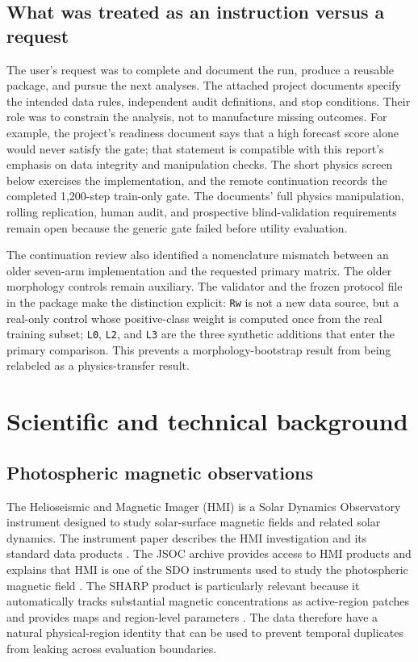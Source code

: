 \documentclass[11pt,oneside]{report}
\begin{document}
\section{What was treated as an instruction versus a request}

The user’s request was to complete and document the run, produce a reusable package, and pursue the next analyses. The attached project documents specify the intended data rules, independent audit definitions, and stop conditions. Their role was to constrain the analysis, not to manufacture missing outcomes. For example, the project’s readiness document says that a high forecast score alone would never satisfy the gate; that statement is compatible with this report’s emphasis on data integrity and manipulation checks. The short physics screen below exercises the implementation, and the remote continuation records the completed 1,200-step train-only gate. The documents’ full physics manipulation, rolling replication, human audit, and prospective blind-validation requirements remain open because the generic gate failed before utility evaluation.

The continuation review also identified a nomenclature mismatch between an older seven-arm implementation and the requested primary matrix. The older morphology controls remain auxiliary. The validator and the frozen protocol file in the package make the distinction explicit: \texttt{Rw} is not a new data source, but a real-only control whose positive-class weight is computed once from the real training subset; \texttt{L0}, \texttt{L2}, and \texttt{L3} are the three synthetic additions that enter the primary comparison. This prevents a morphology-bootstrap result from being relabeled as a physics-transfer result.

\chapter{Scientific and technical background}

\section{Photospheric magnetic observations}

The Helioseismic and Magnetic Imager (HMI) is a Solar Dynamics Observatory instrument designed to study solar-surface magnetic fields and related solar dynamics. The instrument paper describes the HMI investigation and its standard data products \cite{scherrer2012}. The JSOC archive provides access to HMI products and explains that HMI is one of the SDO instruments used to study the photospheric magnetic field \cite{jsoc}. The SHARP product is particularly relevant because it automatically tracks substantial magnetic concentrations as active-region patches and provides maps and region-level parameters \cite{bobra2014}. The data therefore have a natural physical-region identity that can be used to prevent temporal duplicates from leaking across evaluation boundaries.
\end{document}
